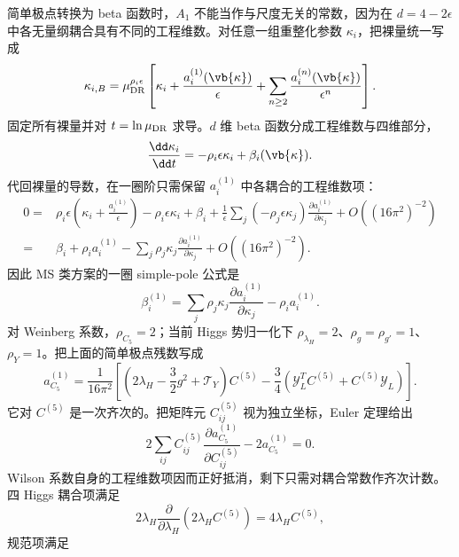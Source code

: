 \begin{derivation}
简单极点转换为 beta 函数时，$A_1$ 不能当作与尺度无关的常数，因为在 $d=4-2\epsilon$ 中各无量纲耦合具有不同的工程维数。对任意一组重整化参数 $\kappa_i$，把裸量统一写成
\begin{equation*}
 \kappa_{i,B}=\mu_{\rm DR}^{\rho_i\epsilon}
 \left[\kappa_i+\frac{a_i^{(1)}(\vb{\kappa})}{\epsilon}
 +\sum_{n\ge2}\frac{a_i^{(n)}(\vb{\kappa})}{\epsilon^n}\right].
\end{equation*}
固定所有裸量并对 $t=\ln\mu_{\rm DR}$ 求导。$d$ 维 beta 函数分成工程维数与四维部分，
\begin{equation*}
 \frac{\dd\kappa_i}{\dd t}
 =-\rho_i\epsilon\kappa_i+\beta_i(\vb{\kappa}).
\end{equation*}
代回裸量的导数，在一圈阶只需保留 $a_i^{(1)}$ 中各耦合的工程维数项：
\begin{align*}
0={}&\rho_i\epsilon
 \left(\kappa_i+\frac{a_i^{(1)}}{\epsilon}\right)
 -\rho_i\epsilon\kappa_i+\beta_i
 +\frac1\epsilon\sum_j
 \left(-\rho_j\epsilon\kappa_j\right)
 \frac{\partial a_i^{(1)}}{\partial\kappa_j}
 +O((16\pi^2)^{-2})\\
={}&\beta_i+\rho_i a_i^{(1)}
 -\sum_j\rho_j\kappa_j
 \frac{\partial a_i^{(1)}}{\partial\kappa_j}
 +O((16\pi^2)^{-2}).
\end{align*}
因此 MS 类方案的一圈 simple-pole 公式是
\begin{equation*}
 \beta_i^{(1)}=
 \sum_j\rho_j\kappa_j
 \frac{\partial a_i^{(1)}}{\partial\kappa_j}
 -\rho_i a_i^{(1)}.
\end{equation*}
对 Weinberg 系数，$\rho_{C_5}=2$；当前 Higgs 势归一化下
$\rho_{\lambda_H}=2$、$\rho_g=\rho_{g'}=1$、$\rho_Y=1$。把上面的简单极点残数写成
\begin{equation*}
 a_{C_5}^{(1)}=\frac1{16\pi^2}\left[
 \left(2\lambda_H-\frac32g^2+\mathcal T_Y\right)C^{(5)}
 -\frac34\left(\mathcal Y_L^TC^{(5)}+C^{(5)}\mathcal Y_L\right)
 \right].
\end{equation*}
它对 $C^{(5)}$ 是一次齐次的。把矩阵元 $C^{(5)}_{ij}$ 视为独立坐标，Euler 定理给出
\begin{equation*}
 2\sum_{ij}C^{(5)}_{ij}
 \frac{\partial a_{C_5}^{(1)}}{\partial C^{(5)}_{ij}}
 -2a_{C_5}^{(1)}=0.
\end{equation*}
Wilson 系数自身的工程维数项因而正好抵消，剩下只需对耦合常数作齐次计数。四 Higgs 耦合项满足
\begin{equation*}
 2\lambda_H\frac{\partial}{\partial\lambda_H}
 \left(2\lambda_H C^{(5)}\right)=4\lambda_H C^{(5)},
\end{equation*}
规范项满足
\begin{equation*}

\end{equation*}
\end{derivation}
